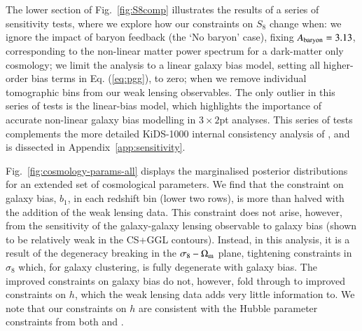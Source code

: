 The lower section of Fig.~\ref{fig:S8comp} illustrates the results of a series of sensitivity tests, where we explore how our constraints on $S_8$ change when: we ignore the impact of baryon feedback (the `No baryon' case), fixing $A_{\rm baryon}=3.13$, corresponding to the non-linear matter power spectrum for a dark-matter only cosmology; we limit the analysis to a linear galaxy bias model, setting all higher-order bias terms in Eq. (\ref{eq:pgg}), to zero; when we remove individual tomographic bins from our weak lensing observables.    The only outlier in this series of tests is the linear-bias model, which highlights the importance of accurate non-linear galaxy bias modelling in $3\times2$pt analyses.    This series of tests complements the more detailed KiDS-1000 internal consistency analysis of \citet{asgari/etal:inprep}, and is dissected in Appendix~\ref{app:sensitivity}.

Fig.~\ref{fig:cosmology-params-all} displays the marginalised posterior distributions for an extended set of cosmological parameters.   We find that the constraint on galaxy bias,  $b_1$, in each redshift bin (lower two rows), is more than halved with the addition of the weak lensing data.   This constraint does not arise, however, from the sensitivity of the galaxy-galaxy lensing observable to galaxy bias (shown to be relatively weak in the CS+GGL contours).  Instead, in this analysis, it is a result of the degeneracy breaking in the $\sigma_8-\Omega_{\rm m}$ plane, tightening constraints in $\sigma_8$ which, for galaxy clustering, is fully degenerate with galaxy bias.  The improved constraints on galaxy bias do not, however, fold through to improved constraints on $h$, which the weak lensing data adds very little information to.   We note that our constraints on $h$ are consistent with the Hubble parameter constraints from both \citet{planck/etal:2018} and \citet{riess/etal:2019}.

